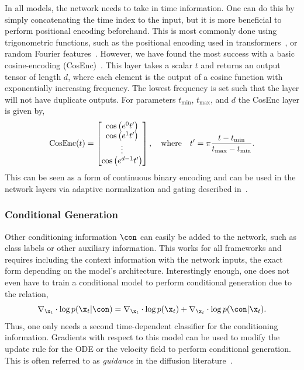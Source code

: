 In all models, the network needs to take in time information.
One can do this by simply concatenating the time index to the input, but it is more beneficial to perform positional encoding beforehand.
This is most commonly done using trigonometric functions, such as the positional encoding used in transformers~\cite{Attention}, or random Fourier features~\cite{FourierFeaturesLet}.
However, we have found the most success with a basic cosine-encoding (CosEnc)~\cite{ImplicitQuantileNetworks}.
This layer takes a scalar $t$ and returns an output tensor of length $d$, where each element is the output of a cosine function with exponentially increasing frequency.
The lowest frequency is set such that the layer will not have duplicate outputs.
For parameters $t_\text{min}$, $t_\text{max}$, and $d$ the CosEnc layer is given by,
\begin{equation}
    \label{eq:cosine_encoding}
    \text{CosEnc}(t) =
    \begin{bmatrix}
        \cos\left(e^0 t'\right) \\
        \cos\left(e^1 t'\right) \\
        \vdots \\
        \cos\left(e^{d-1} t'\right)
    \end{bmatrix}, \quad \text{where} \quad t' = \pi \frac{t - t_\text{min}}{t_\text{max} - t_\text{min}}. \\
\end{equation}
This can be seen as a form of continuous binary encoding and can be used in the network layers via adaptive normalization and gating described in~.

\subsubsection{Conditional Generation}

Other conditioning information $\con$ can easily be added to the network, such as class labels or other auxiliary information.
This works for all frameworks and requires including the context information with the network inputs, the exact form depending on the model's architecture.
Interestingly enough, one does not even have to train a conditional model to perform conditional generation due to the relation,
\begin{equation}
  \label{eq:conditional_generation}
  \nabla_{\x_t} \cdot \log p(\x_t | \con) = \nabla_{\x_t} \cdot \log p(\x_t) + \nabla_{\x_t} \cdot \log p(\con | \x_t).
\end{equation}
Thus, one only needs a second time-dependent classifier for the conditioning information.
Gradients with respect to this model can be used to modify the update rule for the ODE or the velocity field to perform conditional generation.
This is often referred to as \textit{guidance} in the diffusion literature~\cite{DiffusionBeatsGANS}.

